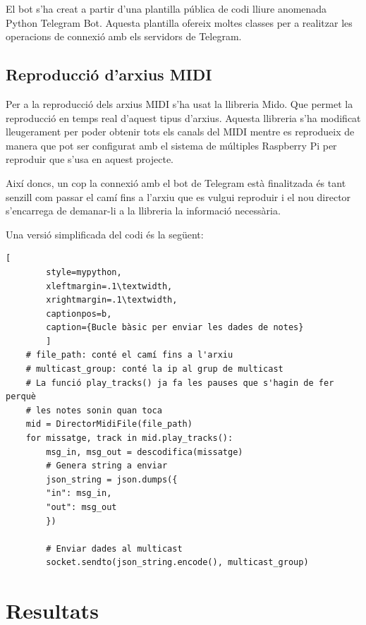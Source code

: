 \documentclass[a4paper]{paper}
\let\oldsection\section
\renewcommand\section{\clearpage\oldsection}
\begin{document}
El bot s'ha creat a partir d'una plantilla pública de codi lliure anomenada Python Telegram Bot\cite{python-telegram-bot}. Aquesta plantilla ofereix moltes classes per a realitzar les operacions de connexió amb els servidors de Telegram.

\subsection{Reproducció d'arxius MIDI}
Per a la reproducció dels arxius MIDI s'ha usat la llibreria Mido\cite{mido}. Que permet la reproducció en temps real d'aquest tipus d'arxius. Aquesta llibreria s'ha modificat lleugerament per poder obtenir tots els canals del MIDI mentre es reprodueix de manera que pot ser configurat amb el sistema de múltiples Raspberry Pi per reproduir que s'usa en aquest projecte.

Així doncs, un cop la connexió amb el bot de Telegram està finalitzada és tant senzill com passar el camí fins a l'arxiu que es vulgui reproduir i el nou director s'encarrega de demanar-li a la llibreria la informació necessària.

Una versió simplificada del codi és la següent:
\begin{lstlisting}[
		style=mypython, 
		xleftmargin=.1\textwidth, 
		xrightmargin=.1\textwidth,
		captionpos=b,
		caption={Bucle bàsic per enviar les dades de notes}
		]
	# file_path: conté el camí fins a l'arxiu
	# multicast_group: conté la ip al grup de multicast
	# La funció play_tracks() ja fa les pauses que s'hagin de fer perquè
	# les notes sonin quan toca
	mid = DirectorMidiFile(file_path)
	for missatge, track in mid.play_tracks():
		msg_in, msg_out = descodifica(missatge)
		# Genera string a enviar
		json_string = json.dumps({
		"in": msg_in,
		"out": msg_out
		})
	
		# Enviar dades al multicast
		socket.sendto(json_string.encode(), multicast_group)
\end{lstlisting}	

\section{Resultats}



\printbibliography
\end{document}

